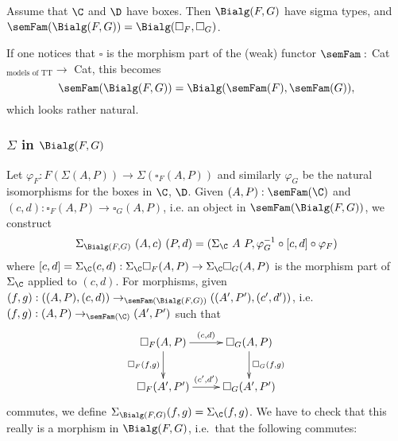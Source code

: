 \documentclass{article}
\begin{document}
Assume that $\C$ and $\D$ have boxes. Then $\Bialg(F, G)$ have sigma
types, and $\semFam(\Bialg(F, G)) = \Bialg(\square_F, \square_G)$.

\begin{remark}
  If one notices that $\square$ is the morphism part of the (weak)
  functor $\semFam :$ Cat$_{\text{models of TT}} \to $ Cat, this
  becomes
  \[
  \semFam(\Bialg(F, G)) = \Bialg(\semFam(F), \semFam(G)),
  \]
  which looks rather natural.
\end{remark}



\subsubsection{$\Sigma$ in $\Bialg(F, G)$}

Let $\varphi_F : F (\Sigma(A, P)) \to \Sigma(\square_F(A, P))$ and
similarly $\varphi_G$ be the natural isomorphisms for the boxes in
$\C$, $\D$. Given $(A, P) : \semFam(\C)$ and $(c, d) : \square_F(A, P)
\to \square_G(A, P)$, i.e. an object in $\semFam(\Bialg(F, G))$, we
construct
\[
\Sigma_{\Bialg(F, G)}\ (A, c)\ (P, d) = (\Sigma_{\C}\ A\ P, \varphi^{-1}_G \circ [c, d] \circ \varphi_F)
\]
where $[c, d] = \Sigma_\C(c, d) : \Sigma_\C \square_F(A, P) \to
\Sigma_\C \square_G(A, P)$ is the morphism part of $\Sigma_\C$ applied
to $(c, d)$. For morphisms, given $(f, g) : ((A, P), (c, d))
\to_{\semFam(\Bialg(F, G))} ((A', P'), (c', d'))$, i.e.\ $(f, g) : (A,
P) \to_{\semFam(\C)} (A', P')$ such that
\begin{equation}
\label{eq:331}
\xymatrix{
\square_F(A, P) \ar^-{(c, d)}[r] \ar_-{\square_F(f, g)}[d] & \square_G(A, P) \ar^-{\square_G(f, g)}[d] \\
\square_F(A', P') \ar^-{(c', d')}[r] & \square_G(A', P') \\
}
\end{equation}
commutes, we define $\Sigma_{\Bialg(F, G)}(f, g) = \Sigma_{\C}(f, g)$.
We have to check that this really is a morphism in
$\Bialg(F, G)$, i.e.\ that the following commutes:
\end{document}
